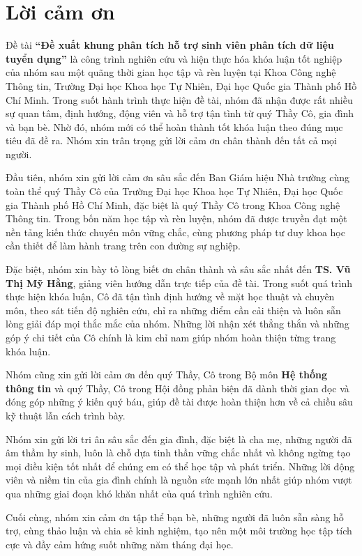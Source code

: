 \chapter*{Lời cảm ơn}
\label{thanks}

Đề tài \textbf{``Đề xuất khung phân tích hỗ trợ sinh viên phân tích dữ liệu tuyển dụng''} là công trình nghiên cứu và hiện thực hóa khóa luận tốt nghiệp của nhóm sau một quãng thời gian học tập và rèn luyện tại Khoa Công nghệ Thông tin, Trường Đại học Khoa học Tự Nhiên, Đại học Quốc gia Thành phố Hồ Chí Minh. Trong suốt hành trình thực hiện đề tài, nhóm đã nhận được rất nhiều sự quan tâm, định hướng, động viên và hỗ trợ tận tình từ quý Thầy Cô, gia đình và bạn bè. Nhờ đó, nhóm mới có thể hoàn thành tốt khóa luận theo đúng mục tiêu đã đề ra. Nhóm xin trân trọng gửi lời cảm ơn chân thành đến tất cả mọi người.

Đầu tiên, nhóm xin gửi lời cảm ơn sâu sắc đến Ban Giám hiệu Nhà trường cùng toàn thể quý Thầy Cô của Trường Đại học Khoa học Tự Nhiên, Đại học Quốc gia Thành phố Hồ Chí Minh, đặc biệt là quý Thầy Cô trong Khoa Công nghệ Thông tin. Trong bốn năm học tập và rèn luyện, nhóm đã được truyền đạt một nền tảng kiến thức chuyên môn vững chắc, cùng phương pháp tư duy khoa học cần thiết để làm hành trang trên con đường sự nghiệp.

Đặc biệt, nhóm xin bày tỏ lòng biết ơn chân thành và sâu sắc nhất đến \textbf{TS. Vũ Thị Mỹ Hằng}, giảng viên hướng dẫn trực tiếp của đề tài. Trong suốt quá trình thực hiện khóa luận, Cô đã tận tình định hướng về mặt học thuật và chuyên môn, theo sát tiến độ nghiên cứu, chỉ ra những điểm cần cải thiện và luôn sẵn lòng giải đáp mọi thắc mắc của nhóm. Những lời nhận xét thẳng thắn và những góp ý chi tiết của Cô chính là kim chỉ nam giúp nhóm hoàn thiện từng trang khóa luận.

Nhóm cũng xin gửi lời cảm ơn đến quý Thầy, Cô trong Bộ môn \textbf{Hệ thống thông tin} và quý Thầy, Cô trong Hội đồng phản biện đã dành thời gian đọc và đóng góp những ý kiến quý báu, giúp đề tài được hoàn thiện hơn về cả chiều sâu kỹ thuật lẫn cách trình bày.

Nhóm xin gửi lời tri ân sâu sắc đến gia đình, đặc biệt là cha mẹ, những người đã âm thầm hy sinh, luôn là chỗ dựa tinh thần vững chắc nhất và không ngừng tạo mọi điều kiện tốt nhất để chúng em có thể học tập và phát triển. Những lời động viên và niềm tin của gia đình chính là nguồn sức mạnh lớn nhất giúp nhóm vượt qua những giai đoạn khó khăn nhất của quá trình nghiên cứu.

Cuối cùng, nhóm xin cảm ơn tập thể bạn bè, những người đã luôn sẵn sàng hỗ trợ, cùng thảo luận và chia sẻ kinh nghiệm, tạo nên một môi trường học tập tích cực và đầy cảm hứng suốt những năm tháng đại học.

